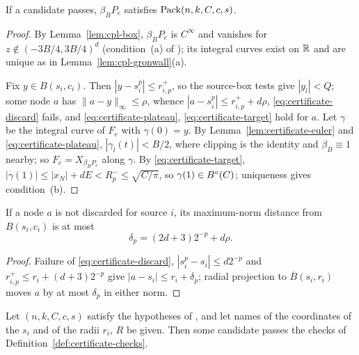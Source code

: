 \begin{theorem}[Soundness]\label{thm:certificate-sound}
If a candidate passes, $\beta_BP_e$ satisfies $\mathrm{Pack}(n,k,C,c,s)$.
\end{theorem}

\begin{proof}
By Lemma~\ref{lem:cpl-box}, $\beta_BP_e$ is $C^\infty$ and vanishes for $z\notin(-3B/4,3B/4)^d$ (condition~(a) of ); its integral curves exist on $\mathbb{R}$ and are unique as in Lemma~\ref{lem:cpl-gronwall}(a).

Fix $y\in B(s_i,c_i)$. Then $|y-s_i^p|\le r^+_{i,p}$, so the source-box tests give $|y_l|<Q$; some node $a$ has $\|a-y\|_\infty\le\rho$, whence $|a-s_i^p|\le r^+_{i,p}+d\rho$, \eqref{eq:certificate-discard} fails, and \eqref{eq:certificate-plateau}, \eqref{eq:certificate-target} hold for $a$. Let $\gamma$ be the integral curve of $F_e$ with $\gamma(0)=y$. By Lemma~\ref{lem:certificate-euler} and \eqref{eq:certificate-plateau}, $|\gamma_l(t)|<B/2$, where clipping is the identity and $\beta_B\equiv1$ nearby; so $F_e=X_{\beta_BP_e}$ along $\gamma$. By \eqref{eq:certificate-target}, $|\gamma(1)|\le|x_N|+dE<R^-_p\le\sqrt{C/\pi}$, so $\gamma(1)\in B^{\circ}(C)$; uniqueness gives condition~(b).
\end{proof}

\begin{lemma}\label{lem:certificate-retained}
If a node $a$ is not discarded for source $i$, its maximum-norm distance from $B(s_i,c_i)$ is at most
\[
 \delta_p=(2d+3)2^{-p}+d\rho.
\]
\end{lemma}

\begin{proof}
Failure of \eqref{eq:certificate-discard}, $|s_i^p-s_i|\le d2^{-p}$ and $r^+_{i,p}\le r_i+(d+3)2^{-p}$ give $|a-s_i|\le r_i+\delta_p$; radial projection to $\overline B(s_i,r_i)$ moves $a$ by at most $\delta_p$ in either norm.
\end{proof}

\begin{theorem}[Nonemptiness]\label{thm:certificate-exists}
Let $(n,k,C,c,s)$ satisfy the hypotheses of , and let names of the coordinates of the $s_i$
and of the radii $r_i$, $R$ be given. Then some candidate passes the checks of
Definition~\ref{def:certificate-checks}.
\end{theorem}

